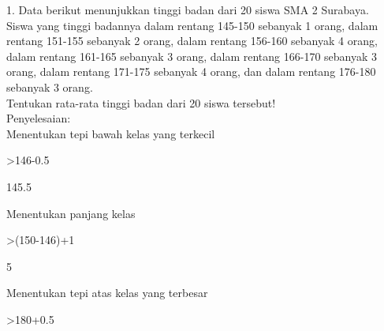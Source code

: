 \documentclass[12pt,arial,letterpaper]{book}
\begin{document}
\begin{eulercomment}
\begin{eulercomment}
\begin{eulercomment}
\begin{eulercomment}
\begin{eulercomment}
\begin{eulercomment}
\begin{eulercomment}
\begin{eulercomment}
\begin{eulercomment}
\begin{eulercomment}
\begin{eulercomment}
\begin{eulercomment}
\begin{eulercomment}
\begin{eulercomment}
\begin{eulercomment}
\begin{eulercomment}
\begin{eulercomment}
\begin{eulercomment}
\begin{eulercomment}
\begin{eulercomment}
\begin{eulercomment}
\begin{eulercomment}
\begin{eulercomment}
\begin{eulercomment}
\begin{eulercomment}
\begin{eulercomment}
\begin{eulercomment}
\begin{eulercomment}
\begin{eulercomment}
\begin{eulercomment}
\begin{eulercomment}
\begin{eulercomment}
\begin{eulercomment}
\begin{eulercomment}
\begin{eulercomment}
\begin{eulercomment}
\begin{eulercomment}
\begin{eulercomment}
\begin{eulercomment}
\end{eulercomment}
\begin{eulercomment}
1. Data berikut menunjukkan tinggi badan dari 20 siswa SMA 2 Surabaya.\\
Siswa yang tinggi badannya dalam rentang 145-150 sebanyak 1 orang,
dalam rentang 151-155 sebanyak 2 orang, dalam rentang 156-160 sebanyak
4 orang, dalam rentang 161-165 sebanyak 3 orang, dalam rentang 166-170
sebanyak 3 orang, dalam rentang 171-175 sebanyak 4 orang, dan dalam
rentang 176-180 sebanyak 3 orang.\\
Tentukan rata-rata tinggi badan dari 20 siswa tersebut!\\
Penyelesaian:\\
Menentukan tepi bawah kelas yang terkecil
\end{eulercomment}
\begin{eulerprompt}
>146-0.5
\end{eulerprompt}
\begin{euleroutput}
  145.5
\end{euleroutput}
\begin{eulercomment}
Menentukan panjang kelas
\end{eulercomment}
\begin{eulerprompt}
>(150-146)+1
\end{eulerprompt}
\begin{euleroutput}
  5
\end{euleroutput}
\begin{eulercomment}
Menentukan tepi atas kelas yang terbesar
\end{eulercomment}
\begin{eulerprompt}
>180+0.5
\end{eulerprompt}

\end{eulercomment}
\end{eulercomment}
\end{eulercomment}
\end{eulercomment}
\end{eulercomment}
\end{eulercomment}
\end{eulercomment}
\end{eulercomment}
\end{eulercomment}
\end{eulercomment}
\end{eulercomment}
\end{eulercomment}
\end{eulercomment}
\end{eulercomment}
\end{eulercomment}
\end{eulercomment}
\end{eulercomment}
\end{eulercomment}
\end{eulercomment}
\end{eulercomment}
\end{eulercomment}
\end{eulercomment}
\end{eulercomment}
\end{eulercomment}
\end{eulercomment}
\end{eulercomment}
\end{eulercomment}
\end{eulercomment}
\end{eulercomment}
\end{eulercomment}
\end{eulercomment}
\end{eulercomment}
\end{eulercomment}
\end{eulercomment}
\end{eulercomment}
\end{eulercomment}
\end{eulercomment}
\end{eulercomment}
\end{document}
